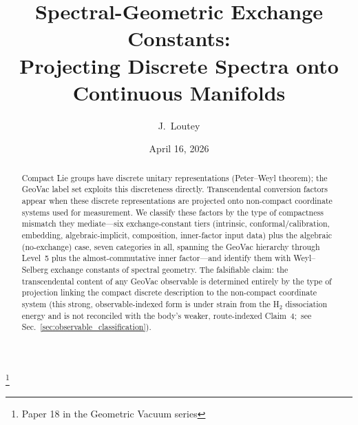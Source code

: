 \documentclass[aps,pra,twocolumn,superscriptaddress,longbibliography]{revtex4-2}
\begin{document}
\title{Spectral-Geometric Exchange Constants:\\
Projecting Discrete Spectra onto Continuous Manifolds}
\thanks{Paper 18 in the Geometric Vacuum series}

\author{J.~Loutey}

\date{April 16, 2026}


\begin{abstract}
Compact Lie groups have discrete unitary representations
(Peter--Weyl theorem); the GeoVac label set exploits this discreteness
directly.  Transcendental conversion factors appear when these
discrete representations are projected onto non-compact coordinate
systems used for measurement.  We classify these factors by the
type of compactness mismatch they mediate---six exchange-constant tiers
(intrinsic, conformal/calibration, embedding, algebraic-implicit,
composition, inner-factor input data) plus the algebraic (no-exchange)
case, seven categories in all, spanning the GeoVac hierarchy
through Level~5 plus the almost-commutative inner factor---and identify
them with Weyl--Selberg exchange constants of spectral geometry.  The
falsifiable claim: the transcendental content of any GeoVac
observable is determined entirely by the type of projection
linking the compact discrete description to the non-compact
coordinate system (this strong, observable-indexed form is under
strain from the H$_2$ dissociation energy and is not reconciled with
the body's weaker, route-indexed Claim~4;\ see
Sec.~\ref{sec:observable_classification}).


\end{abstract}
\end{document}
